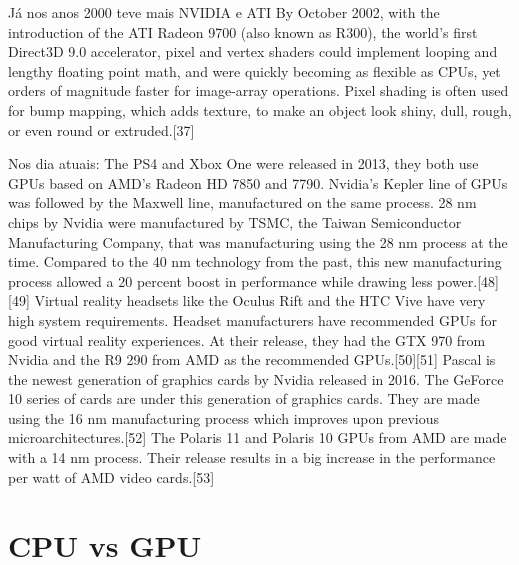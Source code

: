   Já nos anos 2000 teve mais NVIDIA e ATI
  By October 2002, with the introduction of the ATI Radeon 9700 (also known as R300), the world's first Direct3D 9.0 accelerator, pixel and vertex shaders could implement looping and lengthy floating point math, and were quickly becoming as flexible as CPUs, yet orders of magnitude faster for image-array operations. Pixel shading is often used for bump mapping, which adds texture, to make an object look shiny, dull, rough, or even round or extruded.[37]

  Nos dia atuais:
  The PS4 and Xbox One were released in 2013, they both use GPUs based on AMD's Radeon HD 7850 and 7790. Nvidia's Kepler line of GPUs was followed by the Maxwell line, manufactured on the same process. 28 nm chips by Nvidia were manufactured by TSMC, the Taiwan Semiconductor Manufacturing Company, that was manufacturing using the 28 nm process at the time. Compared to the 40 nm technology from the past, this new manufacturing process allowed a 20 percent boost in performance while drawing less power.[48][49] Virtual reality headsets like the Oculus Rift and the HTC Vive have very high system requirements. Headset manufacturers have recommended GPUs for good virtual reality experiences. At their release, they had the GTX 970 from Nvidia and the R9 290 from AMD as the recommended GPUs.[50][51] Pascal is the newest generation of graphics cards by Nvidia released in 2016. The GeForce 10 series of cards are under this generation of graphics cards. They are made using the 16 nm manufacturing process which improves upon previous microarchitectures.[52] The Polaris 11 and Polaris 10 GPUs from AMD are made with a 14 nm process. Their release results in a big increase in the performance per watt of AMD video cards.[53]


\section{CPU vs GPU}

